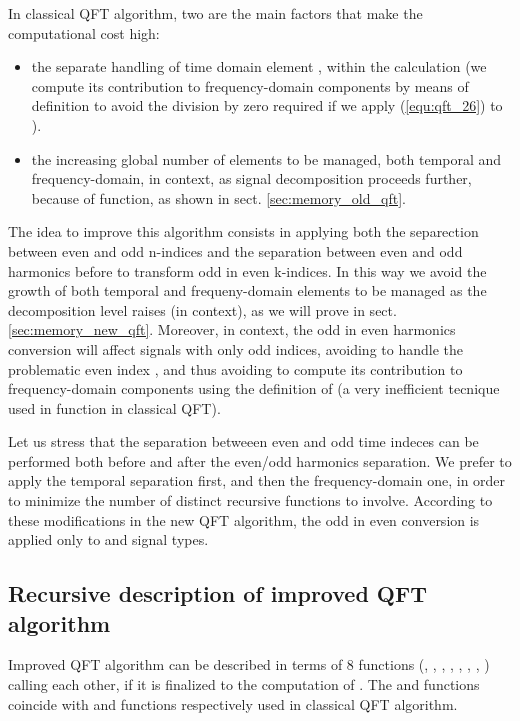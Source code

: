 \documentclass[a4paper,10pt]{article}
\begin{document}
In classical QFT algorithm, two are the main factors that make the computational cost high: 
\begin{itemize}


\item
the separate handling  of time domain element , within the  calculation (we compute its contribution to  frequency-domain components by means of  definition to avoid the division by zero required if we apply (\ref{equ:qft_26}) to ).


\item
the increasing global number of elements to be managed, both temporal and frequency-domain, in  context, as signal decomposition proceeds further, because of  function, as shown in sect. \ref{sec:memory_old_qft}.

\end{itemize}
The idea to improve this algorithm consists in applying both the separection between even and odd n-indices and the separation between even and odd harmonics before to transform odd in even k-indices. 
In this way we avoid the growth of both temporal and frequeny-domain elements to be managed as the decomposition level raises (in  context), as we will prove in sect. \ref{sec:memory_new_qft}.
Moreover, in  context, the odd in even harmonics conversion will affect signals with only odd  indices, avoiding to handle the problematic even index , and thus avoiding to compute its contribution to frequency-domain components using the definition of  (a very inefficient tecnique used in  function in classical QFT). 

Let us stress that the separation betweeen even and odd time indeces can be performed both before and after the even/odd harmonics separation. 
We prefer to apply the temporal separation first, and then the frequency-domain one, in order to minimize the number of distinct recursive functions to involve. 
According to these modifications in the new QFT algorithm, the odd in even conversion is applied only to  and  signal types.






\subsection{Recursive description of improved QFT  algorithm} \label{improved_qft}

Improved QFT algorithm can be described in terms of 8 functions (, , , , , , , ) calling each other, if it is finalized to the computation of .
The  and  functions coincide with  and  functions respectively used in classical QFT algorithm.
\end{document}
